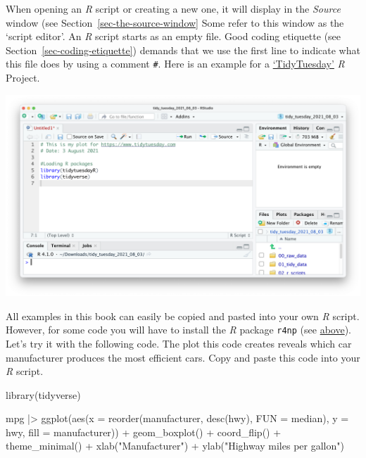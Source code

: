\documentclass[
  letterpaper,
  DIV=11,
  numbers=noendperiod]{scrreprt}
\newenvironment{Shaded}{\begin{snugshade}}{\end{snugshade}}
\newcommand{\AttributeTok}[1]{\textcolor[rgb]{0.40,0.45,0.13}{#1}}
\newcommand{\FunctionTok}[1]{\textcolor[rgb]{0.28,0.35,0.67}{#1}}
\newcommand{\NormalTok}[1]{\textcolor[rgb]{0.00,0.23,0.31}{#1}}
\newcommand{\SpecialCharTok}[1]{\textcolor[rgb]{0.37,0.37,0.37}{#1}}
\newcommand{\StringTok}[1]{\textcolor[rgb]{0.13,0.47,0.30}{#1}}
\begin{document}
When opening an \emph{R} script or creating a new one, it will display
in the \emph{Source} window (see Section~\ref{sec-the-source-window}
Some refer to this window as the `script editor'. An \emph{R} script
starts as an empty file. Good coding etiquette (see
Section~\ref{sec-coding-etiquette}) demands that we use the first line
to indicate what this file does by using a comment \texttt{\#}. Here is
an example for a \href{https://www.tidytuesday.com}{`TidyTuesday'}
\emph{R} Project.

\includegraphics{images/chapter_06_img/02_r_script/00_r_script.png}

All examples in this book can easily be copied and pasted into your own
\emph{R} script. However, for some code you will have to install the
\emph{R} package \texttt{r4np} (see \hyperref[install_r4np]{above}).
Let's try it with the following code. The plot this code creates reveals
which car manufacturer produces the most efficient cars. Copy and paste
this code into your \emph{R} script.

\begin{Shaded}
\begin{Highlighting}[]
\FunctionTok{library}\NormalTok{(tidyverse)}

\NormalTok{mpg }\SpecialCharTok{|\textgreater{}} \FunctionTok{ggplot}\NormalTok{(}\FunctionTok{aes}\NormalTok{(}\AttributeTok{x =} \FunctionTok{reorder}\NormalTok{(manufacturer, }\FunctionTok{desc}\NormalTok{(hwy), }\AttributeTok{FUN =}\NormalTok{ median),}
                   \AttributeTok{y =}\NormalTok{ hwy,}
                   \AttributeTok{fill =}\NormalTok{ manufacturer)) }\SpecialCharTok{+}
  \FunctionTok{geom\_boxplot}\NormalTok{() }\SpecialCharTok{+}
  \FunctionTok{coord\_flip}\NormalTok{() }\SpecialCharTok{+}
  \FunctionTok{theme\_minimal}\NormalTok{() }\SpecialCharTok{+}
  \FunctionTok{xlab}\NormalTok{(}\StringTok{"Manufacturer"}\NormalTok{) }\SpecialCharTok{+}
  \FunctionTok{ylab}\NormalTok{(}\StringTok{"Highway miles per gallon"}\NormalTok{)}
\end{Highlighting}
\end{Shaded}
\end{document}
